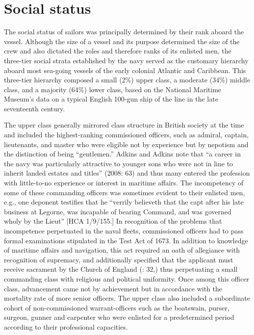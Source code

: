 \section{{Social} {status}}%

  The social status of sailors was principally determined by their rank aboard the vessel. Although the size of a vessel and its purpose determined the size of the crew and also dictated the roles and therefore ranks of its enlisted men, the three-tier social strata established by the navy served as the customary hierarchy aboard most sea-going vessels of the early colonial Atlantic and Caribbean. This three-tier hierarchy composed a small (2\%) upper class, a moderate (34\%) middle class, and a majority (64\%) lower class, based on the National Maritime Museum’s data on a typical English 100-gun ship of the line in the late seventeenth century. 

The upper class generally mirrored class structure in British society at the time and included the highest-ranking commissioned officers, such as admiral, captain, lieutenants, and master who were eligible not by experience but by nepotism and the distinction of being “gentlemen.” Adkins and Adkins note that “a career in the navy was particularly attractive to younger sons who were not in line to inherit landed estates and titles” (2008: 63) and thus many entered the profession with little-to-no experience or interest in maritime affairs. The incompetency of some of these commanding officers was sometimes evident to their enlisted men, e.g., one deponent testifies that he “verrily believeth that the capt after his late business at Legorne, was incapable of bearing Command, and was governed wholy by the Lieut” [HCA 1/9/155.] In recognition of the problems that incompetence perpetuated in the naval fleets, commissioned officers had to pass formal examinations stipulated in the Test Act of 1673. In addition to knowledge of maritime affairs and navigation, this act required an oath of allegiance with recognition of supremacy, and additionally specified that the applicant must receive sacrament by the Church of England (\citealt{AdkinsAdkins2008}: 32,) thus perpetuating a small commanding class with religious and political uniformity. Once among this officer class, advancement came not by achievement but in accordance with the mortality rate of more senior officers. The upper class also included a subordinate cohort of non-commissioned warrant-officers such as the boatswain, purser, surgeon, gunner and carpenter who were enlisted for a predetermined period according to their professional capacities.  

